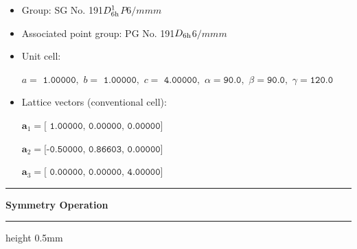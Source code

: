 \documentclass[fleqn,10pt,landscape]{jsarticle}
\begin{document}
\begin{itemize}
\item Group: SG No. 191\quad$D_{\rm 6h}^{1}$\quad$P6/mmm$\quad[ hexagonal ]
\item Associated point group: PG No. 191\quad$D_{\rm 6h}$\quad$6/mmm$\quad[ hexagonal ]
\end{itemize}
\begin{itemize}
\item Unit cell:

\quad $a=\texttt{ 1.00000},\,\, b=\texttt{ 1.00000},\,\, c=\texttt{ 4.00000},\,\, \alpha=\texttt{90.0},\,\, \beta=\texttt{90.0},\,\, \gamma=\texttt{120.0}$

\item Lattice vectors (conventional cell):

\quad $\bm{a}_1=\texttt{[ 1.00000, 0.00000, 0.00000]}$

\quad $\bm{a}_2=\texttt{[-0.50000, 0.86603, 0.00000]}$

\quad $\bm{a}_3=\texttt{[ 0.00000, 0.00000, 4.00000]}$

\end{itemize}
\vspace{5mm}
\noindent \rule[0.5mm]{5mm}{0.5mm}\hspace{3mm}\textbf{Symmetry Operation}\hspace{3mm}\leaders\hrule height 0.5mm\hfill\kern0pt
\vspace{3mm}
\end{document}
